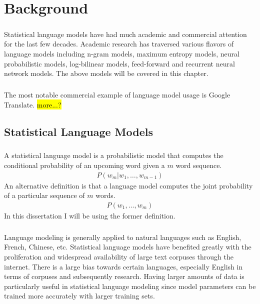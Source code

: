 \documentclass[12pt]{ociamthesis}
\begin{document}
\chapter{Background}
\paragraph{}
Statistical language models have had much academic and commercial attention for the last few decades. Academic research has traversed various flavors of language models including n-gram models, maximum entropy models, neural probabilistic models, log-bilinear models, feed-forward and recurrent neural network models. The above models will be covered in this chapter. 
\paragraph{}
The most notable commercial example of language model usage is Google Translate. \hl{more...?}

\section{Statistical Language Models}
\paragraph{}
A statistical language model is a probabilistic model that computes the conditional probability of an upcoming word given a $m$ word sequence. 
\begin{align}
P(w_m | w_1,\dots, w_{m-1})
\end{align}
An alternative definition is that a language model computes the joint probability of a particular sequence of  $m$ words. 
\begin{align}
P(w_1, \dots ,w_m)
\end{align}
In this dissertation I will be using the former definition. 
\paragraph{}
Language modeling is generally applied to natural languages such as English, French, Chinese, etc. Statistical language models have benefited greatly with the proliferation and widespread availability of large text corpuses through the internet. There is a large bias towards certain languages, especially English in terms of corpuses and subsequently research. Having larger amounts of data is particularly useful in statistical language modeling since model parameters can be trained more accurately with larger training sets. 
\end{document}
